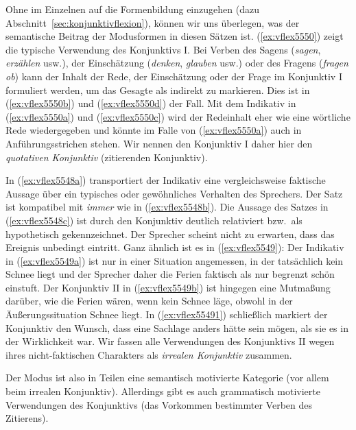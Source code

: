 Ohne im Einzelnen auf die Formenbildung einzugehen (dazu Abschnitt~\ref{sec:konjunktivflexion}), können wir uns überlegen, was der semantische Beitrag der Modusformen in diesen Sätzen ist.
(\ref{ex:vflex5550}) zeigt die typische Verwendung des Konjunktivs I.
Bei Verben des Sagens (\textit{sagen}, \textit{erzählen} usw.), der Einschätzung (\textit{denken}, \textit{glauben} usw.) oder des Fragens (\textit{fragen ob}) kann der Inhalt der Rede, der Einschätzung oder der Frage im Konjunktiv I formuliert werden, um das Gesagte als indirekt zu markieren.
Dies ist in (\ref{ex:vflex5550b}) und (\ref{ex:vflex5550d}) der Fall.
Mit dem Indikativ in (\ref{ex:vflex5550a}) und (\ref{ex:vflex5550c}) wird der Redeinhalt eher wie eine wörtliche Rede wiedergegeben und könnte im Falle von (\ref{ex:vflex5550a}) auch in Anführungsstrichen stehen.
Wir nennen den Konjunktiv I daher hier den \textit{quotativen Konjunktiv} (zitierenden Konjunktiv).

In (\ref{ex:vflex5548a}) transportiert der Indikativ eine vergleichsweise faktische Aussage über ein typisches oder gewöhnliches Verhalten des Sprechers.
Der Satz ist kompatibel mit \textit{immer} wie in (\ref{ex:vflex5548b}).
Die Aussage des Satzes in (\ref{ex:vflex5548c}) ist durch den Konjunktiv deutlich relativiert bzw.\ als hypothetisch gekennzeichnet.
Der Sprecher scheint nicht zu erwarten, dass das Ereignis unbedingt eintritt.
Ganz ähnlich ist es in (\ref{ex:vflex5549}):
Der Indikativ in (\ref{ex:vflex5549a}) ist nur in einer Situation angemessen, in der tatsächlich kein Schnee liegt und der Sprecher daher die Ferien faktisch als nur begrenzt schön einstuft.
Der Konjunktiv II in (\ref{ex:vflex5549b}) ist hingegen eine Mutmaßung darüber, wie die Ferien wären, wenn kein Schnee läge, obwohl in der Äußerungssituation Schnee liegt.
In (\ref{ex:vflex55491}) schließlich markiert der Konjunktiv den Wunsch, dass eine Sachlage anders hätte sein mögen, als sie es in der Wirklichkeit war.
Wir fassen alle Verwendungen des Konjunktivs II wegen ihres nicht-faktischen Charakters als \textit{irrealen Konjunktiv} zusammen.

Der Modus ist also in Teilen eine semantisch motivierte Kategorie (vor allem beim irrealen Konjunktiv).
Allerdings gibt es auch grammatisch motivierte Verwendungen des Konjunktivs (das Vorkommen bestimmter Verben des Zitierens).


